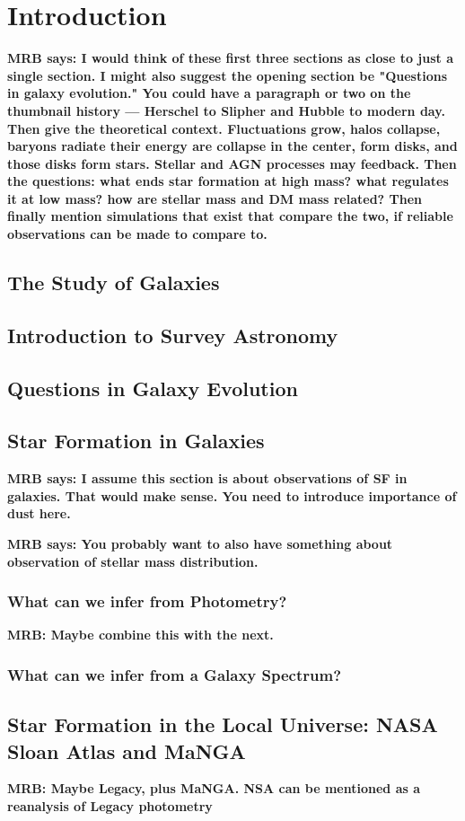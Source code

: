 \chapter{Introduction}
\label{introduction}

{\bf MRB says: I would think of these first three 
sections as close to just a single section. I might 
also suggest the opening section be "Questions in 
galaxy evolution." You could have a paragraph or two
on the thumbnail history --- Herschel to Slipher and
Hubble to modern day. Then give the theoretical context.
Fluctuations grow, halos collapse, baryons radiate their
energy are collapse in the center, form disks, and those
disks form stars. Stellar and AGN processes may feedback.
Then the questions: what ends star formation at high mass?
what  regulates it at low mass? how are 
stellar mass and DM mass related? Then finally mention
simulations that exist that compare the two, if reliable
observations can be made to compare to.
}

\section{The Study of Galaxies}

\section{Introduction to Survey Astronomy}

\section{Questions in Galaxy Evolution}

\section{Star Formation in Galaxies}

{\bf MRB says: I assume this section is about observations 
of SF in galaxies. That would make sense. You need to 
introduce importance of dust here.}

{\bf MRB says: You probably want to also have something
about observation of stellar mass distribution.}

\subsection{What can we infer from Photometry?}

{\bf MRB: Maybe combine this with the next.}

\subsection{What can we infer from a Galaxy Spectrum?}

\section{Star Formation in the Local Universe: NASA Sloan Atlas and MaNGA}

{\bf MRB: Maybe Legacy, plus MaNGA. NSA can be mentioned
as a reanalysis of Legacy photometry}


